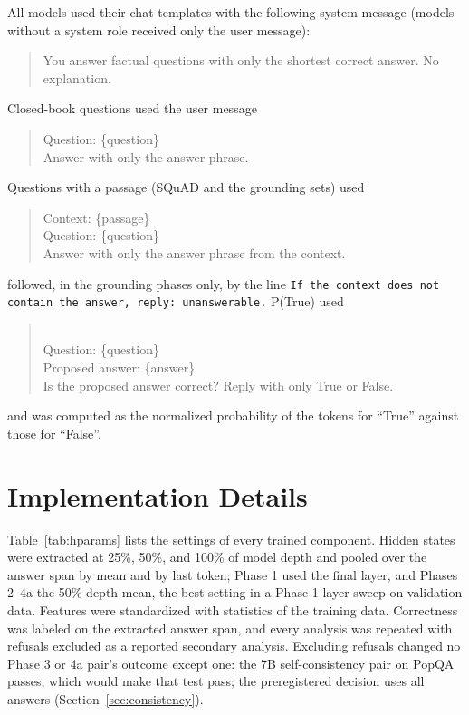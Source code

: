 \documentclass[10pt]{article}
\begin{document}
All models used their chat templates with the following system message (models without a system role received only the user message):
\begin{quote}\small\ttfamily
You answer factual questions with only the shortest correct answer. No explanation.
\end{quote}
Closed-book questions used the user message
\begin{quote}\small\ttfamily
Question: \{question\}\\
Answer with only the answer phrase.
\end{quote}
Questions with a passage (SQuAD and the grounding sets) used
\begin{quote}\small\ttfamily
Context: \{passage\}\\
Question: \{question\}\\
Answer with only the answer phrase from the context.
\end{quote}
followed, in the grounding phases only, by the line \texttt{If the context does not contain the answer, reply: unanswerable.} P(True) used
\begin{quote}\small{}\\
Question: \{question\}\\
Proposed answer: \{answer\}\\
Is the proposed answer correct? Reply with only True or False.
\end{quote}
and was computed as the normalized probability of the tokens for ``True'' against those for ``False''.

\section{Implementation Details}
\label{app:implementation}

Table~\ref{tab:hparams} lists the settings of every trained component. Hidden states were extracted at 25\%, 50\%, and 100\% of model depth and pooled over the answer span by mean and by last token; Phase 1 used the final layer, and Phases 2--4a the 50\%-depth mean, the best setting in a Phase 1 layer sweep on validation data. Features were standardized with statistics of the training data. Correctness was labeled on the extracted answer span, and every analysis was repeated with refusals excluded as a reported secondary analysis. Excluding refusals changed no Phase 3 or 4a pair's outcome except one: the 7B self-consistency pair on PopQA passes, which would make that test pass; the preregistered decision uses all answers (Section~\ref{sec:consistency}).
\end{document}
